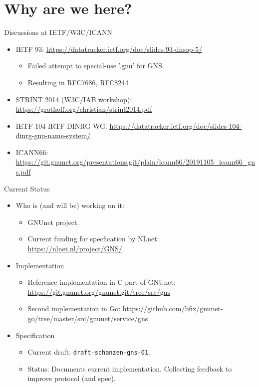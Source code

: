 \documentclass[aspectratio=169]{beamer}
\begin{document}
\section{Why are we here?}
\begin{frame}{Discussions at IETF/W3C/ICANN}
  \begin{itemize}
    \item IETF 93: \url{https://datatracker.ietf.org/doc/slides-93-dnsop-5/}
      \begin{itemize}
        \item Failed attempt to special-use '.gnu' for GNS.
        \item Resulting in RFC7686, RFC8244
      \end{itemize}
    \item STRINT 2014 (W3C/IAB workshop): \url{https://grothoff.org/christian/strint2014.pdf}
    \item IETF 104 IRTF DINRG WG: \url{https://datatracker.ietf.org/doc/slides-104-dinrg-gnu-name-system/}
    \item ICANN66: \url{https://git.gnunet.org/presentations.git/plain/icann66/20191105_icann66_gns.pdf}
  \end{itemize}
\end{frame}


\begin{frame}{Current Status}
  \begin{itemize}
    \item Who is (and will be) working on it:
      \begin{itemize}
        \item GNUnet project.
        \item Current funding for specfication by NLnet: \url{https://nlnet.nl/project/GNS/}.
      \end{itemize}
    \item Implementation
      \begin{itemize}
        \item Reference implementation in C part of GNUnet: \url{https://git.gnunet.org/gnunet.git/tree/src/gns}
        \item Second implementation in Go: https://github.com/bfix/gnunet-go/tree/master/src/gnunet/service/gns
      \end{itemize}
    \item Specification
      \begin{itemize}
        \item Current draft: \texttt{draft-schanzen-gns-01}.
        \item Status: Documents current implementation. Collecting feedback to improve protocol (and spec).
      \end{itemize}
  \end{itemize}
\end{frame}
\end{document}

